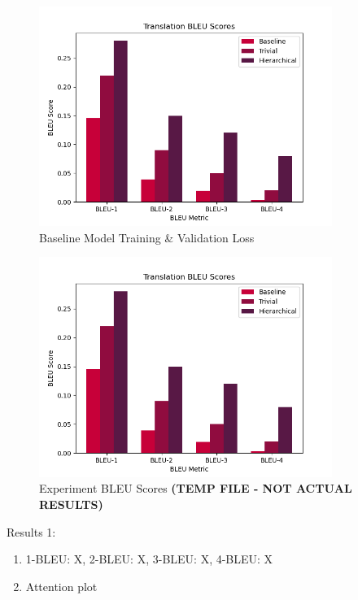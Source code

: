 \begin{figure}[ht!]
\centering
\includegraphics[width=0.85\textwidth]{media/experiments/results/bleu_scores.png}
\captionsetup{justification=centering}
\caption[Baseline Model Training \& Validation Loss]{Baseline Model Training \& Validation Loss}
\label{fig:bleu_vocab}
\end{figure}


\begin{figure}[ht!]
\centering
\includegraphics[width=0.85\textwidth]{media/experiments/results/bleu_scores.png}
\captionsetup{justification=centering}
\caption[Experiment BLEU Scores]{Experiment BLEU Scores \textbf{(TEMP FILE - NOT ACTUAL RESULTS)}}
\label{fig:bleu_results}
\end{figure}


Results 1:
\begin{enumerate}
    \item 1-BLEU: X, 2-BLEU: X, 3-BLEU: X, 4-BLEU: X
    \item Attention plot
\end{enumerate}

